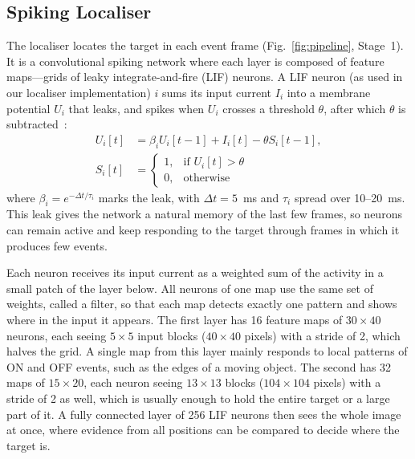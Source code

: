 \documentclass[conference]{IEEEtran}
\begin{document}
\subsection{Spiking Localiser}
\label{sec:localiser}
The localiser locates the target in each event frame (Fig.~\ref{fig:pipeline}, Stage~1). It is a convolutional spiking network where each layer is composed of feature maps---grids of leaky integrate-and-fire (LIF) neurons. A LIF neuron (as used in our localiser implementation) $i$ sums its input current $I_i$ into a membrane potential $U_i$ that leaks, and spikes when $U_i$ crosses a threshold $\theta$, after which $\theta$ is subtracted~\cite{Eshraghian2023Training}:
\begin{equation}
\begin{aligned}
U_i[t] &= \beta_i U_i[t-1] + I_i[t] - \theta S_i[t-1],\\
S_i[t] &= \begin{cases} 1, & \text{if } U_i[t] > \theta\\ 0, & \text{otherwise} \end{cases}
\end{aligned}
\end{equation}
where $\beta_i = e^{-\Delta t/\tau_i}$ marks the leak, with $\Delta t = 5$~ms and $\tau_i$ spread over 10--20~ms. This leak gives the network a natural memory of the last few frames, so neurons can remain active and keep responding to the target through frames in which it produces few events.

Each neuron receives its input current as a weighted sum of the activity in a small patch of the layer below. All neurons of one map use the same set of weights, called a filter, so that each map detects exactly one pattern and shows where in the input it appears. The first layer has 16 feature maps of $30\times40$ neurons, each seeing $5\times5$ input blocks ($40\times40$ pixels) with a stride of 2, which halves the grid. A single map from this layer mainly responds to local patterns of ON and OFF events, such as the edges of a moving object. The second has 32 maps of $15\times20$, each neuron seeing $13\times13$ blocks ($104\times104$ pixels) with a stride of 2 as well, which is usually enough to hold the entire target or a large part of it. A fully connected layer of 256 LIF neurons then sees the whole image at once, where evidence from all positions can be compared to decide where the target is.
\end{document}
